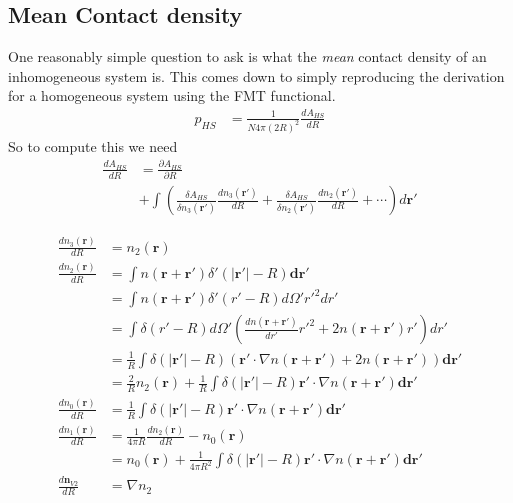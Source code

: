 \documentclass[letterpaper,twocolumn,amsmath,amssymb,prb]{revtex4-1}
\begin{document}
\begin{widetext}

\section{Mean Contact density}\label{simple-contact}

One reasonably simple question to ask is what the \emph{mean} contact
density of an inhomogeneous system is.  This comes down to simply
reproducing the derivation for a homogeneous system using the
FMT functional.
\begin{align}
  p_{HS} &= \frac{1}{N 4\pi (2R)^2} \frac{dA_{HS}}{dR}
\end{align}
So to compute this we need
\begin{align}
  \frac{d A_{HS}}{d R} &=
  \frac{\partial A_{HS}}{\partial R} \\
  &+
  \int \left(
  \frac{\delta A_{HS}}{\delta n_3(\mathbf{r}')}
  \frac{d n_3(\mathbf{r}')}{d R}
  +
  \frac{\delta A_{HS}}{\delta n_2(\mathbf{r}')}
  \frac{d n_2(\mathbf{r}')}{d R}
  + \cdots
  \right) d\mathbf{r}'
\end{align}

\begin{align}
  \frac{dn_3(\mathbf{r})}{dR} &= n_2(\mathbf{r})\\
  \frac{dn_2(\mathbf{r})}{dR} &= \int n(\mathbf{r}+\mathbf{r}')
  \delta'(|\mathbf{r'}| - R)\mathbf{dr}'\\
  &= \int n(\mathbf{r}+\mathbf{r}')
  \delta'(r' - R) d\Omega' r'^2 dr'\\
  &= \int 
  \delta(r' - R) d\Omega' \left(\frac{dn(\mathbf{r}+\mathbf{r}')}{dr'}r'^2 + 2n(\mathbf{r}+\mathbf{r}')r' \right) dr'\\
  &= \frac1{R} \int 
  \delta(|\mathbf{r}'| - R)
  \left(\mathbf{r}'\cdot \nabla n(\mathbf{r}+\mathbf{r}') +
  2n(\mathbf{r}+\mathbf{r}') \right) \mathbf{dr}' \\
  &= \frac{2}{R}n_2(\mathbf{r}) + \frac{1}{R} \int 
  \delta(|\mathbf{r}'| - R)\mathbf{r}'\cdot \nabla n(\mathbf{r}+\mathbf{r}') \mathbf{dr}' \\
  \frac{dn_0(\mathbf{r})}{dR} &= \frac{1}{R} \int 
  \delta(|\mathbf{r}'| - R)\mathbf{r}'\cdot \nabla n(\mathbf{r}+\mathbf{r}') \mathbf{dr}' \\
  \frac{dn_1(\mathbf{r})}{dR} &=
    \frac1{4\pi R}\frac{dn_2(\mathbf{r})}{dR} - n_0(\mathbf{r}) \\
    &= n_0(\mathbf{r}) + \frac{1}{4\pi R^2} \int 
    \delta(|\mathbf{r}'| - R)\mathbf{r}'\cdot \nabla n(\mathbf{r}+\mathbf{r}') \mathbf{dr}' \\
  \frac{d\mathbf{n}_{V2}}{dR} &= \nabla n_2
\end{align}


\end{widetext}
\end{document}
